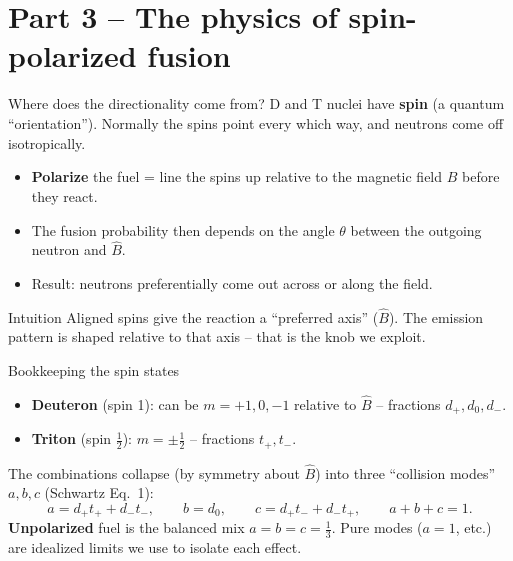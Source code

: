 \documentclass[aspectratio=169]{beamer}
\newcommand{\Bhat}{\hat{B}}
\newcommand{\keyword}[1]{\textcolor{blue!60!black}{\textbf{#1}}}
\begin{document}
\section{Part 3 -- The physics of spin-polarized fusion}
\begin{frame}{Where does the directionality come from?}
  D and T nuclei have \keyword{spin} (a quantum ``orientation''). Normally the spins point every which way, and neutrons come off isotropically.
  \vfill
  \begin{itemize}
    \item \keyword{Polarize} the fuel = line the spins up relative to the magnetic field $\Bhat$ \alert{before} they react.
    \item The fusion probability then depends on the \alert{angle $\theta$ between the outgoing neutron and $\Bhat$}.
    \item Result: neutrons preferentially come out \alert{across} or \alert{along} the field.
  \end{itemize}
  \vfill
  \begin{block}{Intuition}
    Aligned spins give the reaction a ``preferred axis'' ($\Bhat$). The emission pattern is shaped relative to that axis -- that is the knob we exploit.
  \end{block}
\end{frame}

\begin{frame}{Bookkeeping the spin states}
  \begin{itemize}
    \item \keyword{Deuteron} (spin 1): can be $m=+1,0,-1$ relative to $\Bhat$ -- fractions $d_+,d_0,d_-$.
    \item \keyword{Triton} (spin $\tfrac12$): $m=\pm\tfrac12$ -- fractions $t_+,t_-$.
  \end{itemize}
  The combinations collapse (by symmetry about $\Bhat$) into \alert{three ``collision modes''} $a,b,c$ (Schwartz Eq.~1):
  \[
    a = d_+t_+ + d_-t_-,\qquad b = d_0,\qquad c = d_+t_- + d_-t_+,\qquad a+b+c=1.
  \]
  \vfill
  \footnotesize \keyword{Unpolarized} fuel is the balanced mix $a=b=c=\tfrac13$. Pure modes ($a{=}1$, etc.) are idealized limits we use to isolate each effect.
\end{frame}
\end{document}
